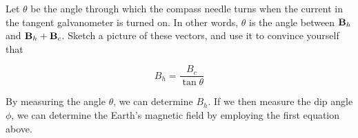 Let $\theta$ be the angle through which the compass needle turns
when the current in the tangent galvanometer is turned on.
In other words, $\theta$ is the angle between ${\bf B}_h$ and
${\bf B}_h+{\bf B}_c$.  Sketch a picture of these vectors, and
use it to convince yourself that

%
%
%
%

\begin{displaymath} B_h = \frac{B_c}{\tan\theta} \end{displaymath}

\vskip 1in

By measuring the angle $\theta$, we can determine $B_h$.  
If we then 
measure the dip angle $\phi$, we can determine
the Earth's magnetic field by employing the first equation above.


